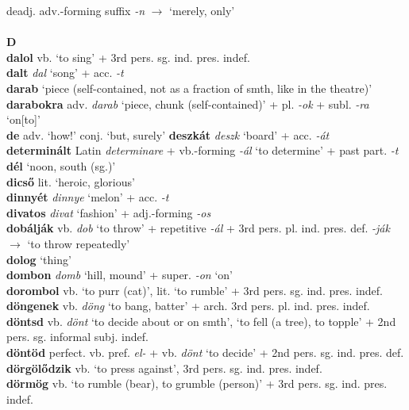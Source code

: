 \documentclass[11pt]{article}
\begin{document}
deadj. adv.\hyp{}forming suffix \emph{-n} $\rightarrow$ `merely, only' \\
\ \\
\noindent \textbf{\large D} \\
\textbf{dalol} vb. `to sing' + 3rd pers. sg. ind. pres. indef. \\
\textbf{dalt} \emph{dal} `song' + acc. \emph{-t} \\
\textbf{darab} `piece (self\hyp{}contained, not as a fraction of
  smth, like in the theatre)' \\
\textbf{darabokra} adv. \emph{darab} `piece, chunk (self\hyp{}contained)' +
  pl. \emph{-ok} + subl. \emph{-ra} `on[to]' \\
\textbf{de} adv. `how!' \textbar\textbar{} conj. `but, surely'
\textbf{deszkát} \emph{deszk} `board' + acc. \emph{-át} \\
\textbf{determinált} Latin \emph{determinare} + vb.\hyp{}forming \emph{-ál}
`to determine' + past part. \emph{-t} \\
\textbf{dél} `noon, south (sg.)' \\
\textbf{dicső} lit. `heroic, glorious' \\
\textbf{dinnyét} \emph{dinnye} `melon' + acc. \emph{-t} \\
\textbf{divatos} \emph{divat} `fashion' +
adj.\hyp{}forming \emph{-os} \\
\textbf{dobálják} vb. \emph{dob} `to throw' + repetitive \emph{-ál} + 3rd
pers. pl. ind. pres. def. \emph{-ják} $\rightarrow$ `to throw
repeatedly' \\
\textbf{dolog} `thing' \\
\textbf{dombon} \emph{domb} `hill, mound' + super. \emph{-on} `on' \\
\textbf{dorombol} vb. `to purr (cat)', lit. `to rumble' + 3rd
pers. sg. ind. pres. indef. \\
\textbf{döngenek} vb. \emph{döng} `to bang, batter' + arch. 3rd
pers. pl. ind. pres. indef. \\
\textbf{döntsd} vb. \emph{dönt} `to decide about or on
smth', \textbar\textbar{} `to fell
(a tree), to topple' + 2nd pers. sg. informal subj. indef. \\
\textbf{döntöd} perfect. vb. pref. \emph{el-} + vb. \emph{dönt} `to
decide' + 2nd pers. sg. ind. pres. def. \\
\textbf{dörgölődzik} vb. `to press against', 3rd
pers. sg. ind. pres. indef. \\
\textbf{dörmög} vb. `to rumble (bear), to grumble (person)' + 3rd
pers. sg. ind. pres. indef. \\
\end{document}
